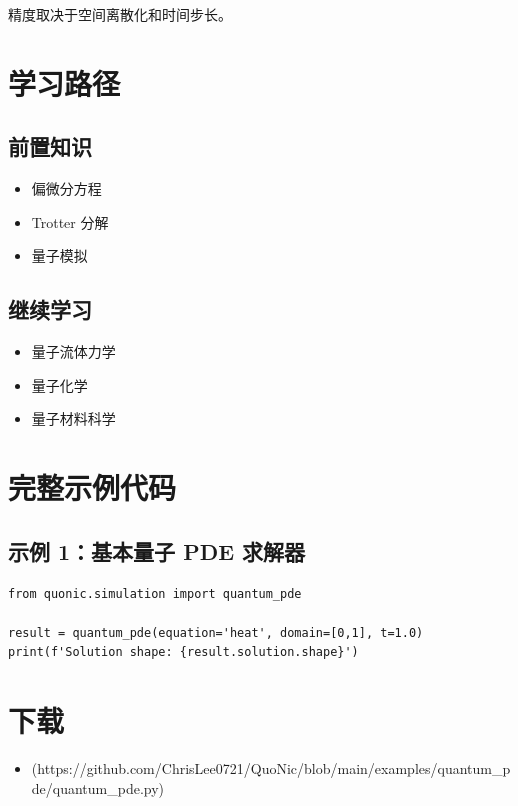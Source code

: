 \documentclass[12pt,a4paper]{article}
\begin{document}
精度取决于空间离散化和时间步长。

\section{学习路径}

\subsection{前置知识}
\begin{itemize}
  \item 偏微分方程
  \item Trotter 分解
  \item 量子模拟
\end{itemize}

\subsection{继续学习}
\begin{itemize}
  \item 量子流体力学
  \item 量子化学
  \item 量子材料科学
\end{itemize}

\section{完整示例代码}

\subsection{示例 1：基本量子 PDE 求解器}

\begin{verbatim}
from quonic.simulation import quantum_pde

result = quantum_pde(equation='heat', domain=[0,1], t=1.0)
print(f'Solution shape: {result.solution.shape}')
\end{verbatim}

\section{下载}

\begin{itemize}
  \item [quantum\_pde.py](https://github.com/ChrisLee0721/QuoNic/blob/main/examples/quantum_pde/quantum_pde.py)
\end{itemize}
\end{document}
